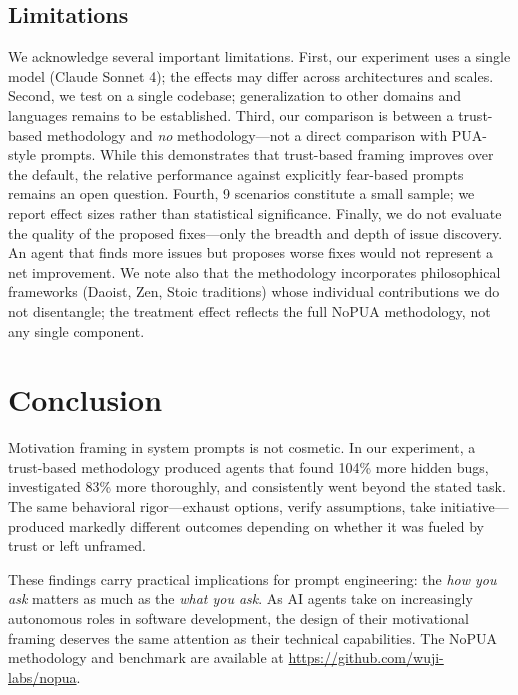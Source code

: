 \documentclass[11pt]{article}
\begin{document}
\subsection{Limitations}

We acknowledge several important limitations. First, our experiment uses a single model (Claude Sonnet 4); the effects may differ across architectures and scales. Second, we test on a single codebase; generalization to other domains and languages remains to be established. Third, our comparison is between a trust-based methodology and \textit{no} methodology---not a direct comparison with PUA-style prompts. While this demonstrates that trust-based framing improves over the default, the relative performance against explicitly fear-based prompts remains an open question. Fourth, 9 scenarios constitute a small sample; we report effect sizes rather than statistical significance. Finally, we do not evaluate the quality of the proposed fixes---only the breadth and depth of issue discovery. An agent that finds more issues but proposes worse fixes would not represent a net improvement. We note also that the methodology incorporates philosophical frameworks (Daoist, Zen, Stoic traditions) whose individual contributions we do not disentangle; the treatment effect reflects the full NoPUA methodology, not any single component.

\section{Conclusion}

Motivation framing in system prompts is not cosmetic. In our experiment, a trust-based methodology produced agents that found 104\% more hidden bugs, investigated 83\% more thoroughly, and consistently went beyond the stated task. The same behavioral rigor---exhaust options, verify assumptions, take initiative---produced markedly different outcomes depending on whether it was fueled by trust or left unframed.

These findings carry practical implications for prompt engineering: the \textit{how you ask} matters as much as the \textit{what you ask}. As AI agents take on increasingly autonomous roles in software development, the design of their motivational framing deserves the same attention as their technical capabilities. The NoPUA methodology and benchmark are available at \url{https://github.com/wuji-labs/nopua}.



\end{document}
